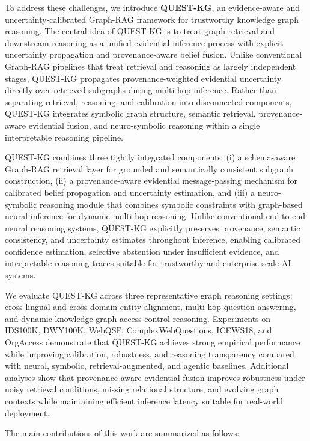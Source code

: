 \documentclass[sigconf,review,anonymous]{acmart}
\begin{document}
To address these challenges, we introduce \textbf{QUEST-KG}, an evidence-aware and uncertainty-calibrated Graph-RAG framework for trustworthy knowledge graph reasoning. The central idea of QUEST-KG is to treat graph retrieval and downstream reasoning as a unified evidential inference process with explicit uncertainty propagation and provenance-aware belief fusion. Unlike conventional Graph-RAG pipelines that treat retrieval and reasoning as largely independent stages, QUEST-KG propagates provenance-weighted evidential uncertainty directly over retrieved subgraphs during multi-hop inference. Rather than separating retrieval, reasoning, and calibration into disconnected components, QUEST-KG integrates symbolic graph structure, semantic retrieval, provenance-aware evidential fusion, and neuro-symbolic reasoning within a single interpretable reasoning pipeline.

QUEST-KG combines three tightly integrated components: (i) a schema-aware Graph-RAG retrieval layer for grounded and semantically consistent subgraph construction, (ii) a provenance-aware evidential message-passing mechanism for calibrated belief propagation and uncertainty estimation, and (iii) a neuro-symbolic reasoning module that combines symbolic constraints with graph-based neural inference for dynamic multi-hop reasoning. Unlike conventional end-to-end neural reasoning systems, QUEST-KG explicitly preserves provenance, semantic consistency, and uncertainty estimates throughout inference, enabling calibrated confidence estimation, selective abstention under insufficient evidence, and interpretable reasoning traces suitable for trustworthy and enterprise-scale AI systems.

We evaluate QUEST-KG across three representative graph reasoning settings: cross-lingual and cross-domain entity alignment, multi-hop question answering, and dynamic knowledge-graph access-control reasoning. Experiments on IDS100K, DWY100K, WebQSP, ComplexWebQuestions, ICEWS18, and OrgAccess demonstrate that QUEST-KG achieves strong empirical performance while improving calibration, robustness, and reasoning transparency compared with neural, symbolic, retrieval-augmented, and agentic baselines. Additional analyses show that provenance-aware evidential fusion improves robustness under noisy retrieval conditions, missing relational structure, and evolving graph contexts while maintaining efficient inference latency suitable for real-world deployment.

The main contributions of this work are summarized as follows:
\end{document}
